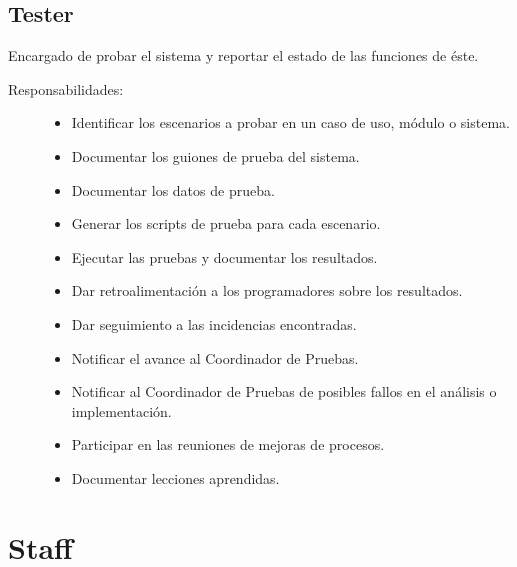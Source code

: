 \subsection{Tester}
	Encargado de probar el sistema y reportar el estado de las funciones de éste.
\begin{description}
	\item[Responsabilidades:] \cdtEmpty 	
    \begin{itemize}
    	\item Identificar los escenarios a probar en un caso de uso, módulo o sistema.
    	\item Documentar los guiones de prueba del sistema.
    	\item Documentar los datos de prueba.
    	\item Generar los scripts de prueba para cada escenario.
    	\item Ejecutar las pruebas y documentar los resultados.
    	\item Dar retroalimentación a los programadores sobre los resultados.
    	\item Dar seguimiento a las incidencias encontradas.
    	\item Notificar el avance al Coordinador de Pruebas.
    	\item Notificar al Coordinador de Pruebas de posibles fallos en el análisis o implementación.
    	\item Participar en las reuniones de mejoras de procesos.
    	\item Documentar lecciones aprendidas.
    \end{itemize}
\end{description}

\section{Staff}


